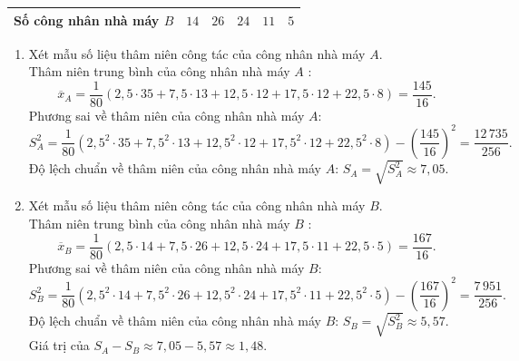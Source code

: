 \begin{bt}
{\begin{center}
\begin{tabular}{|>{\PBS\centering}m{6cm}|>{\PBS\centering}m{1.5cm}|>{\PBS\centering}m{1.5cm}| >{\PBS\centering}m{1.5cm}|>{\PBS\centering}m{1.5cm}|>{\PBS\centering}m{1.5cm}|}
				\hline
				\textbf{Số công nhân nhà máy $B$}&$14$&$26$&$24$&$11$&$5$\\
				\hline
			\end{tabular}
		\end{center}
		\begin{enumerate}[$\bullet$]
			\item Xét mẫu số liệu thâm niên công tác của công nhân nhà máy $A$.\\
			Thâm niên trung bình của công nhân nhà máy $A$ :
			$$\overline{x}_A=\dfrac{1}{80}\left(2{,}5\cdot 35+7{,}5\cdot 13+12{,}5\cdot 12+17{,}5\cdot 12+22{,}5\cdot8\right)=\dfrac{145}{16}.$$
			Phương sai về thâm niên của công nhân nhà máy $A$: $$S_A^2=\dfrac{1}{80}\left(2{,}5^2\cdot 35+7{,}5^2\cdot 13+12{,}5^2\cdot 12+17{,}5^2\cdot 12+22{,}5^2\cdot8\right)-\left(\dfrac{145}{16}\right)^2 =\dfrac{12\,735}{256}.$$
			Độ lệch chuẩn  về thâm niên của công nhân nhà máy $A$: $S_A=\sqrt{S_A^2}\approx 7{,}05$.
			\item Xét mẫu số liệu thâm niên công tác của công nhân nhà máy $B$.\\
			Thâm niên trung bình của công nhân nhà máy $B$ :
			$$\overline{x}_B=\dfrac{1}{80}\left(2{,}5\cdot 14+7{,}5\cdot 26+12{,}5\cdot 24+17{,}5\cdot 11+22{,}5\cdot5\right)=\dfrac{167}{16}.$$
			Phương sai về thâm niên của công nhân nhà máy $B$: $$S_B^2=\dfrac{1}{80}\left(2{,}5^2\cdot 14+7{,}5^2\cdot 26+12{,}5^2\cdot 24+17{,}5^2\cdot 11+22{,}5^2\cdot 5\right)-\left(\dfrac{167}{16}\right)^2 =\dfrac{7\,951}{256}.$$
			Độ lệch chuẩn  về thâm niên của công nhân nhà máy $B$: $S_B=\sqrt{S_B^2}\approx 5{,}57$.\\
			Giá trị của $S_A-S_B\approx 7{,}05-5{,}57\approx 1{,}48$.
		\end{enumerate}
	}
\end{bt}

